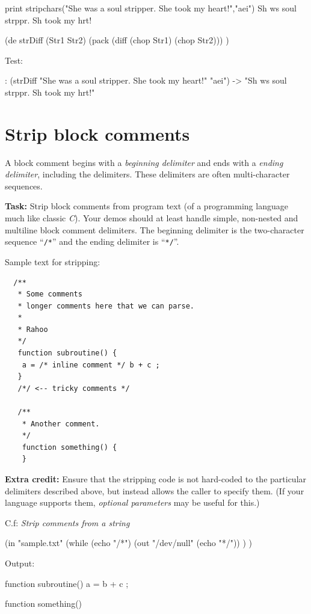 \begin{wideverbatim}
print stripchars("She was a soul stripper. She took my heart!","aei")
Sh ws  soul strppr. Sh took my hrt!
\end{wideverbatim}

\begin{wideverbatim}

(de strDiff (Str1 Str2)
   (pack (diff (chop Str1) (chop Str2))) )

Test:

: (strDiff "She was a soul stripper. She took my heart!" "aei")
-> "Sh ws  soul strppr. Sh took my hrt!"

\end{wideverbatim}

\pagebreak{}
\section*{Strip block comments}

A block comment begins with a \emph{beginning delimiter} and ends with a
\emph{ending delimiter}, including the delimiters. These delimiters are
often multi-character sequences.

\textbf{Task:} Strip block comments from program text (of a programming
language much like classic \emph{C}). Your demos should at
least handle simple, non-nested and multiline block comment delimiters.
The beginning delimiter is the two-character sequence ``\texttt{/*}''
and the ending delimiter is ``\texttt{*/}''.

Sample text for stripping:

\begin{verbatim}
  /**
   * Some comments
   * longer comments here that we can parse.
   *
   * Rahoo 
   */
   function subroutine() {
    a = /* inline comment */ b + c ;
   }
   /*/ <-- tricky comments */

   /**
    * Another comment.
    */
    function something() {
    }
\end{verbatim}

\textbf{Extra credit:} Ensure that the stripping code is not
hard-coded to the particular delimiters described above, but instead
allows the caller to specify them. (If your language supports them,
\emph{optional parameters} may be useful for this.)

C.f: \emph{Strip comments from a string}


\begin{wideverbatim}

(in "sample.txt"
   (while (echo "/*")
      (out "/dev/null" (echo "*/")) ) )

Output:


   function subroutine() {
    a =  b + c ;
   }



    function something() {
    }

\end{wideverbatim}

